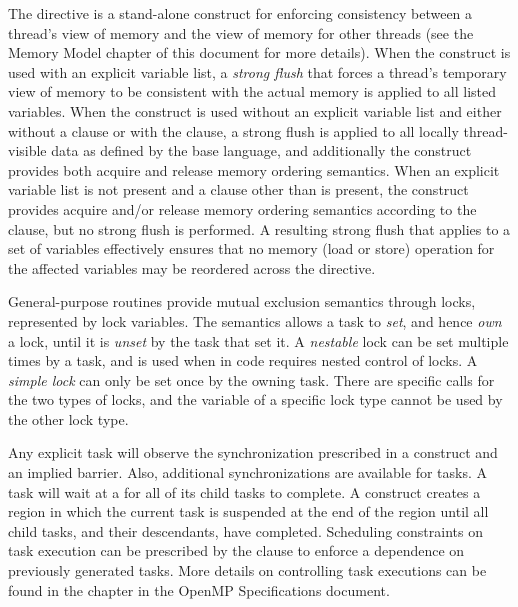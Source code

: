The  directive is a stand-alone construct for enforcing consistency
between a thread's view of memory and the view of memory for other threads (see
the Memory Model chapter of this document for more details). When the construct
is used with an explicit variable list, a \emph{strong flush} that forces a
thread's temporary view of memory to be consistent with the actual memory is
applied to all listed variables. When the construct is used without an explicit
variable list and either without a  clause or with the
  clause, a strong flush is applied to all
locally thread-visible data as defined by the base language, and additionally
the construct provides both acquire and release memory ordering semantics.
When an explicit variable list is not present and a  clause
other than  is present, the construct provides acquire and/or
release memory ordering semantics according to the  clause,
but no strong flush is performed. A resulting strong flush that applies to a
set of variables effectively ensures that no memory (load or store) operation
for the affected variables may be reordered across the  directive.

General-purpose routines provide mutual exclusion semantics through locks, 
represented by lock variables.  
The semantics allows a task to \emph{set}, and hence 
\emph{own} a lock, until it is \emph{unset} by the task that set it. A 
\emph{nestable} lock can be set multiple times by a task, and is used
when in code requires nested control of locks.  A \emph{simple lock} can
only be set once by the owning task. There are specific calls for the two
types of locks, and the variable of a specific lock type cannot be used by the
other lock type.  

Any explicit task will observe the synchronization prescribed in a
 construct and an implied barrier.  Also, additional
synchronizations are available for tasks.  A task will wait at a
 for all of its child tasks to complete.  A 
construct creates a region in which the current task is suspended at the end of
the region until all child tasks, and their descendants, have completed.
Scheduling constraints on task execution can be prescribed by the
 clause to enforce a dependence on previously generated tasks.
More details on controlling task executions can be found in the  chapter in the OpenMP Specifications document. %















 





